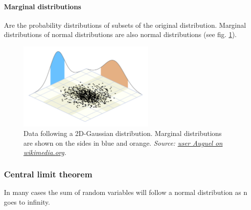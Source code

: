 \documentclass[../main.tex]{subfiles}
\begin{document}
        \paragraph{Marginal distributions}  Are the probability distributions of subsets of the original distribution. Marginal distributions of normal distributions are also normal distributions (see fig. \ref{Multivar_gaussian}).
                \begin{figure}[h]
                    \centering
                    \includegraphics[width=0.6\textwidth]{../figures/Multivariate_gaussian.png}
                    \caption{Data following a 2D-Gaussian distribution. Marginal distributions are shown on the sides in blue and orange. \textit{Source: \href{https://commons.wikimedia.org/wiki/File:Multivariate_Gaussian_inequality_demonstration.svg}{user Auguel on wikimedia.org}.}}
                    \label{Multivar_gaussian}
                \end{figure}


    \subsubsection{Central limit theorem}  \label{CLT}
    In many cases the sum of random variables will follow a normal distribution as n goes to infinity. 
\end{document}
